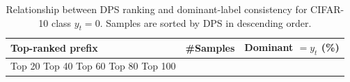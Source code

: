 \begin{table}[t]
\centering
\begin{tabular}{lrr}
\toprule
Top-ranked prefix & \#Samples & Dominant $= y_t$ (\%) \\
\midrule
Top 20%
Top 40%
Top 60%
Top 80%
Top 100%
\bottomrule
\caption{Relationship between DPS ranking and dominant-label consistency for CIFAR-10 class $y_t=0$. Samples are sorted by DPS in descending order.}
\label{tab:class_0_prefix}
\end{tabular}
\end{table}
